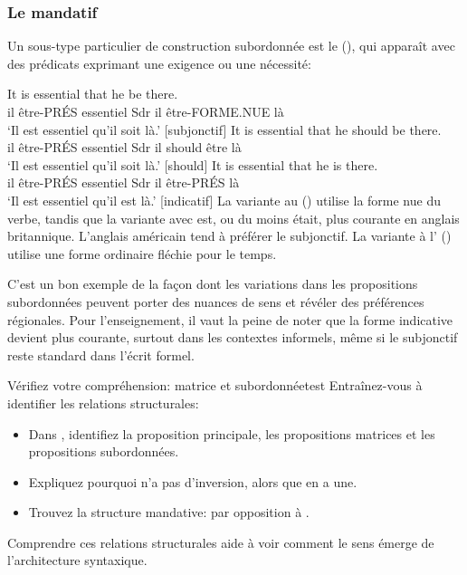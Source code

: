 \subsubsection*{Le mandatif}

Un sous-type particulier de construction subordonnée est le  (), qui apparaît avec des prédicats exprimant une exigence ou une nécessité:

\ea \label{ex:mandative-fr}
    \ea \gll It is essential {\ob}that he be there{\cb}.\\
        il être-PRÉS essentiel Sdr il être-FORME.NUE là\\
    \glt `Il est essentiel qu'il soit là.' [subjonctif]
    \ex \gll It is essential {\ob}that he should be there{\cb}.\\
        il être-PRÉS essentiel Sdr il should être là\\
    \glt `Il est essentiel qu'il soit là.' [should]
    \ex \gll It is essential {\ob}that he is there{\cb}.\\
        il être-PRÉS essentiel Sdr il être-PRÉS là\\
    \glt `Il est essentiel qu'il est là.' [indicatif]
    \z
\z
La variante au  () utilise la forme nue du verbe, tandis que la variante avec  est, ou du moins était, plus courante en anglais britannique. L'anglais américain tend à préférer le subjonctif. La variante à l' () utilise une forme ordinaire fléchie pour le temps.

C'est un bon exemple de la façon dont les variations dans les propositions subordonnées peuvent porter des nuances de sens et révéler des préférences régionales. Pour l'enseignement, il vaut la peine de noter que la forme indicative devient plus courante, surtout dans les contextes informels, même si le subjonctif reste standard dans l'écrit formel.

\begin{tblsframedsymbol}{Vérifiez votre compréhension: matrice et subordonnée}{test}
Entraînez-vous à identifier les relations structurales:
\begin{itemize}[noitemsep, leftmargin=*]
    \item Dans , identifiez la proposition principale, les propositions matrices et les propositions subordonnées.
    \item Expliquez pourquoi  n'a pas d'inversion, alors que  en a une.
    \item Trouvez la structure mandative:  par opposition à .
\end{itemize}
Comprendre ces relations structurales aide à voir comment le sens émerge de l'architecture syntaxique.
\end{tblsframedsymbol}

